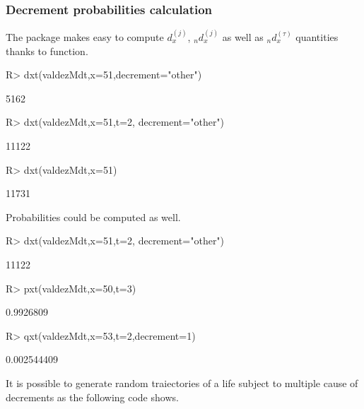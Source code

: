 \documentclass[nojss]{jss}
\begin{document}
\subsubsection{Decrement probabilities calculation}


The  package makes easy to compute $d_{x}^{(j)}$,
${}_{n}d_{x}^{(j)}$ as well as ${}_{n}d_{x}^{(\tau)}$ quantities thanks to
 function.

\begin{Schunk}
\begin{Sinput}
R> dxt(valdezMdt,x=51,decrement="other")
\end{Sinput}
\begin{Soutput}
[1] 5162
\end{Soutput}
\begin{Sinput}
R> dxt(valdezMdt,x=51,t=2, decrement="other")
\end{Sinput}
\begin{Soutput}
[1] 11122
\end{Soutput}
\begin{Sinput}
R> dxt(valdezMdt,x=51)
\end{Sinput}
\begin{Soutput}
[1] 11731
\end{Soutput}
\end{Schunk}

Probabilities could be computed as well.

\begin{Schunk}
\begin{Sinput}
R> dxt(valdezMdt,x=51,t=2, decrement="other")
\end{Sinput}
\begin{Soutput}
[1] 11122
\end{Soutput}
\begin{Sinput}
R> pxt(valdezMdt,x=50,t=3)
\end{Sinput}
\begin{Soutput}
[1] 0.9926809
\end{Soutput}
\begin{Sinput}
R> qxt(valdezMdt,x=53,t=2,decrement=1)
\end{Sinput}
\begin{Soutput}
[1] 0.002544409
\end{Soutput}
\end{Schunk}

It is possible to generate random traiectories of a life subject to multiple cause of decrements as the following code shows.
\end{document}
